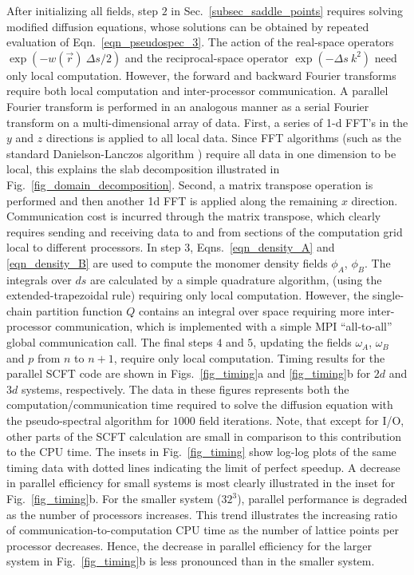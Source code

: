 \documentclass[onecolumn,amsmath,amssymb,floatfix]{elsart}
\begin{document}
After initializing all fields, step $2$ in Sec.~\ref{subsec_saddle_points}
requires solving modified diffusion equations, whose solutions can be obtained
by repeated evaluation of Eqn.~\ref{eqn_pseudospec_3}.
The action of the real-space operators $\exp(- w({\vec r}) \ \Delta s / 2)$
and the reciprocal-space operator $\exp(- \Delta s \ k^2)$ need only local computation.
However, the forward and backward Fourier transforms require both local computation and
inter-processor communication.
A parallel Fourier transform is performed in an analogous manner as a serial
Fourier transform on a multi-dimensional array of data.
First, a series of  1-d FFT's in the $y$ and $z$ directions is applied to
all local data.
Since FFT algorithms (such as the standard Danielson-Lanczos algorithm \cite{pres92})
require all data in one dimension to be local, this explains the slab decomposition
illustrated in Fig.~\ref{fig_domain_decomposition}.
Second, a
matrix transpose operation is performed and then another 1d FFT is
applied along the remaining $x$ direction.
Communication cost is incurred through the matrix transpose,
which clearly requires sending and receiving data to and from
sections of the computation grid local to different processors.
In step $3$, Eqns.~\ref{eqn_density_A} and \ref{eqn_density_B} are used to
compute the monomer density fields $\phi_A$, $\phi_B$.
The integrals over $ds$ are calculated by a simple quadrature algorithm,
(using the extended-trapezoidal rule) requiring only local computation.
However, the single-chain partition function $Q$ contains an integral
over space requiring more inter-processor communication, which
is implemented with a simple MPI ``all-to-all'' \cite{mpi_book}
global communication call.
The final steps $4$ and $5$,
updating the fields $\omega_A$, $\omega_B$ and $p$ from $n$ to
$n+1$, require only local computation.
Timing results for the
parallel SCFT code are shown in Figs.~\ref{fig_timing}a and
\ref{fig_timing}b for $2d$ and $3d$ systems, respectively.
The data in these figures represents both the
computation/communication time required to solve the diffusion equation
with the pseudo-spectral algorithm for $1000$ field iterations.
Note, that except for I/O, other parts of the SCFT calculation are small
in comparison to this contribution to the CPU time.
The insets in Fig.~\ref{fig_timing} show log-log plots of the same timing data with
dotted lines indicating the limit of perfect speedup.
A decrease in parallel efficiency for small systems is most
clearly illustrated in the inset for Fig.~\ref{fig_timing}b.
For the smaller system ($32^3$), parallel performance is degraded
as the number of processors increases.
This trend
illustrates the increasing ratio of communication-to-computation CPU time
as the number of lattice points per processor decreases.
Hence, the decrease in parallel efficiency for the larger system in
Fig.~\ref{fig_timing}b is less pronounced than in the smaller system.
\end{document}
